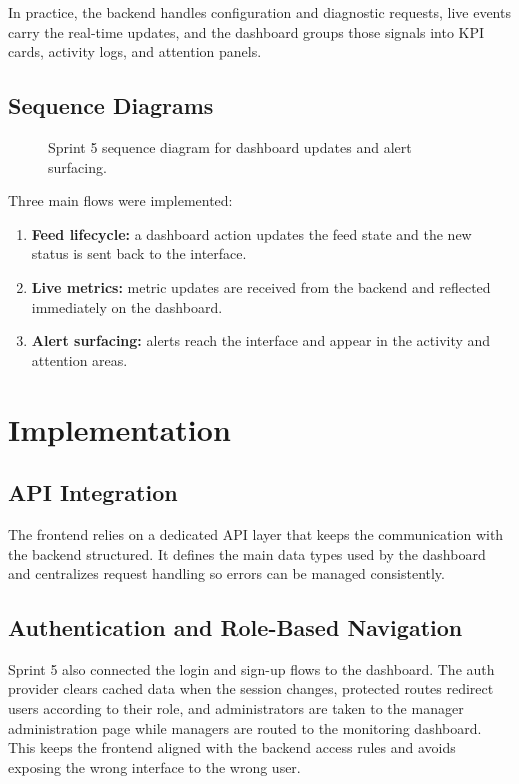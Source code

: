 In practice, the backend handles configuration and diagnostic requests, live events carry the real-time updates, and the dashboard groups those signals into KPI cards, activity logs, and attention panels.

\subsection{Sequence Diagrams}
\begin{figure}[H]
    \centering
    \caption{Sprint 5 sequence diagram for dashboard updates and alert surfacing.}
    \label{fig:sprint5_sequence}
\end{figure}

Three main flows were implemented:
\begin{enumerate}
    \item \textbf{Feed lifecycle:} a dashboard action updates the feed state and the new status is sent back to the interface.
    \item \textbf{Live metrics:} metric updates are received from the backend and reflected immediately on the dashboard.
    \item \textbf{Alert surfacing:} alerts reach the interface and appear in the activity and attention areas.
\end{enumerate}

\section{Implementation}
\subsection{API Integration}
The frontend relies on a dedicated API layer that keeps the communication with the backend structured. It defines the main data types used by the dashboard and centralizes request handling so errors can be managed consistently.

\subsection{Authentication and Role-Based Navigation}
Sprint 5 also connected the login and sign-up flows to the dashboard. The auth provider clears cached data when the session changes, protected routes redirect users according to their role, and administrators are taken to the manager administration page while managers are routed to the monitoring dashboard. This keeps the frontend aligned with the backend access rules and avoids exposing the wrong interface to the wrong user.

